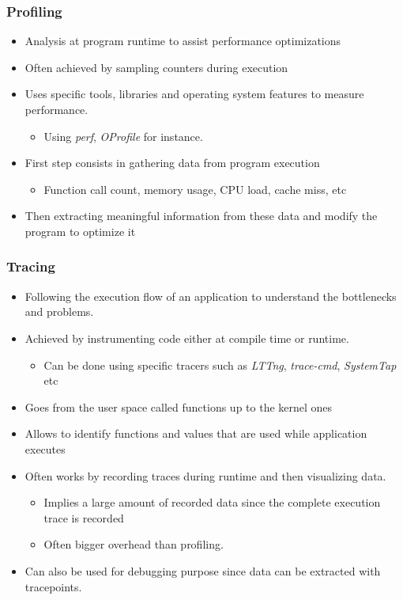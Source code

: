 \begin{frame}
  \frametitle{Profiling}
  \begin{itemize}
    \item Analysis at program runtime to assist performance optimizations
    \item Often achieved by sampling counters during execution
    \item Uses specific tools, libraries and operating system features to
          measure performance.
    \begin{itemize}
      \item Using {\em perf}, {\em OProfile} for instance.
    \end{itemize}
    \item First step consists in gathering data from program execution
    \begin{itemize}
      \item Function call count, memory usage, CPU load, cache miss, etc
    \end{itemize}
    \item Then extracting meaningful information from these data and modify the
          program to optimize it
\end{itemize}
\end{frame}

\begin{frame}
  \frametitle{Tracing}
  \begin{itemize}
    \item Following the execution flow of an application to understand the
          bottlenecks and problems.
    \item Achieved by instrumenting code either at compile time or runtime.
    \begin{itemize}
      \item Can be done using specific tracers such as {\em LTTng},
            {\em trace-cmd}, {\em SystemTap} etc
    \end{itemize}
    \item Goes from the user space called functions up to the kernel ones
    \item Allows to identify functions and values that are used while
          application executes
    \item Often works by recording traces during runtime and then visualizing
          data.
    \begin{itemize}
      \item Implies a large amount of recorded data since the complete execution
            trace is recorded
      \item Often bigger overhead than profiling.
    \end{itemize}
    \item Can also be used for debugging purpose since data can be extracted
          with tracepoints.
  \end{itemize}
\end{frame}

